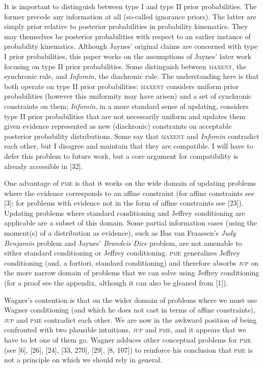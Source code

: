 \documentclass[entropy,article,submit,oneauthor,pdftex,12pt,a4paper]{mdpi}
\begin{document}
It is important to distinguish between type I and type II prior
probabilities. The former precede any information at all (so-called
ignorance priors). The latter are simply prior relative to posterior
probabilities in probability kinematics. They may themselves be
posterior probabilities with respect to an earlier instance of
probability kinematics. Although Jaynes' original claims are concerned
with type I prior probabilities, this paper works on the assumptions
of Jaynes' later work focusing on type II prior probabilities. Some
distinguish between \textsc{maxent}, the synchronic rule, and
\emph{Infomin}, the diachronic rule. The understanding here is that
both operate on type II prior probabilities: \textsc{maxent} considers
uniform prior probabilities (however this uniformity may have arisen)
and a set of synchronic constraints on them; \emph{Infomin}, in a more
standard sense of updating, considers type II prior probabilities that
are not necessarily uniform and updates them given evidence
represented as new (diachronic) constraints on acceptable posterior
probability distributions. Some say that \textsc{maxent} and
\emph{Infomin} contradict each other, but I disagree and maintain that
they are compatible. I will have to defer this problem to future work,
but a core argument for compatibility is already accessible in [32].

One advantage of \textsc{pme} is that it works on the wide domain of
updating problems where the evidence corresponds to an affine
constraint (for affine constraints see [3]; for problems with
evidence not in the form of affine constraints see [23]). Updating
problems where standard conditioning and Jeffrey conditioning are
applicable are a subset of this domain. Some partial information cases
(using the moment(s) of a distribution as evidence), such as Bas van
Fraassen's \emph{Judy Benjamin} problem and Jaynes' \emph{Brandeis
  Dice} problem, are not amenable to either standard conditioning or
Jeffrey conditioning. \textsc{pme} generalizes Jeffrey conditioning
(and, a fortiori, standard conditioning) and therefore absorbs
\textsc{jup} on the more narrow domain of problems that we can solve
using Jeffrey conditioning (for a proof see the appendix, although it
can also be gleaned from [1]). 

Wagner's contention is that on the wider domain of problems where we
must use Wagner conditioning (and which he does not cast in terms of
affine constraints), \textsc{jup} and \textsc{pme} contradict each
other. We are now in the awkward position of being confronted with two
plausible intuitions, \textsc{jup} and \textsc{pme}, and it appears
that we have to let one of them go. Wagner adduces other conceptual
problems for \textsc{pme} (see [6], [26], [24], [33, 270], [29],
[8, 107]) to reinforce his conclusion that \textsc{pme} is not a
principle on which we should rely in general.
\end{document}
